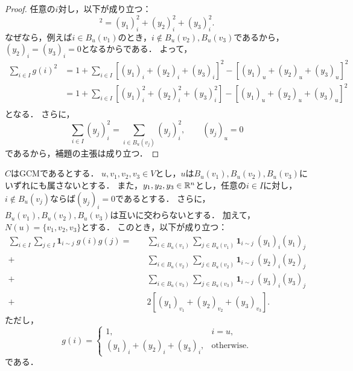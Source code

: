 \begin{proof}
  任意の$i$対し，以下が成り立つ：
  \begin{equation}
    [(y_1)_i + (y_2)_i + (y_3)_i] ^ 2 = (y_1)_i ^ 2 + (y_2)_i ^ 2 + (y_3)_i ^ 2.
  \end{equation}
  なぜなら，例えば$i \in B_u(v_1)$のとき，$i \notin B_u(v_2), B_u(v_3)$であるから，$(y_2)_i = (y_3)_i = 0$となるからである．
  よって，
  \begin{align}
    \sum_{i \in I} g(i) ^ 2
    &= 1 + \sum_{i \in I} [(y_1)_i + (y_2)_i + (y_3)_i] ^ 2 - [(y_1)_u + (y_2)_u + (y_3)_u] ^ 2 \\
    &= 1 + \sum_{i \in I} [(y_1)_i ^ 2 + (y_2)_i ^ 2 + (y_3)_i ^ 2] - [(y_1)_u + (y_2)_u + (y_3)_u] ^ 2 \\
  \end{align}
  となる．
  さらに，
  \begin{equation}
    \sum_{i \in I} (y_j)_i ^ 2 = \sum_{i \in B_u(v_j)} (y_j)_i ^ 2,\qquad (y_j)_u = 0
  \end{equation}
  であるから，補題の主張は成り立つ．
\end{proof}

\begin{lemma}
  \label{lem:assembly_cross}
  \leanok
  $C$はGCMであるとする．
  $u, v_1, v_2, v_3 \in V$とし，$u$は$B_u(v_1), B_u(v_2), B_u(v_3)$にいずれにも属さないとする．
  また，$y_1, y_2, y_3 \in \mathbb{R}^n$とし，任意の$i \in I$に対し，$i \notin B_u(v_j)$ならば$(y_j)_i = 0$であるとする．
  さらに，$B_u(v_1), B_u(v_2), B_u(v_3)$は互いに交わらないとする．
  加えて，$N(u) = \{v_1, v_2, v_3\}$とする．
  このとき，以下が成り立つ：
  \begin{equation}
    \begin{split}
      \sum_{i \in I} \sum_{j \in I} \bm{1}_{i \sim j}\ g(i) g(j)
    {}={}\quad &\sum_{i \in B_u(v_1)} \sum_{j \in B_u(v_1)} \bm{1}_{i \sim j}\ (y_1)_i (y_1)_j \\
    {}+{} &\sum_{i \in B_u(v_2)} \sum_{j \in B_u(v_2)} \bm{1}_{i \sim j}\ (y_2)_i (y_2)_j \\
    {}+{} &\sum_{i \in B_u(v_3)} \sum_{j \in B_u(v_3)} \bm{1}_{i \sim j}\ (y_3)_i (y_3)_j \\
    {}+{} & 2 [(y_1)_{v_1} + (y_2)_{v_2} + (y_3)_{v_3}].
    \end{split}
  \end{equation}
  ただし，
  \begin{equation}
    g(i) = \begin{cases}
      1, & i = u, \\
      (y_1)_i + (y_2)_i + (y_3)_i, & \textrm{otherwise}.
    \end{cases}
  \end{equation}
  である．
\end{lemma}


